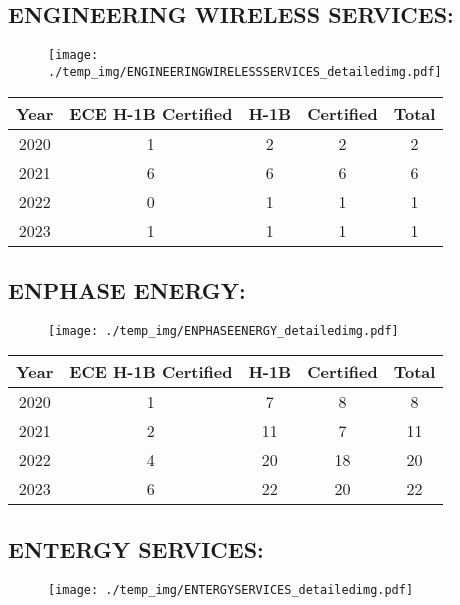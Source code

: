 \documentclass{article}%
\begin{document}
%
\newpage%
\subsection{ENGINEERING WIRELESS SERVICES:}%
\label{subsec:ENGINEERINGWIRELESSSERVICES}%
\label{ENGINEERINGWIRELESSSERVICESdetailed}%


\begin{figure}[htbp]%
\centering%
\texttt{[image: ./temp\_img/ENGINEERINGWIRELESSSERVICES\_detailedimg.pdf]}%
\end{figure}

%
\begin{longtable}{c|c|c|c|c}%
\hline%
Year&ECE H{-}1B Certified&H{-}1B&Certified&Total\\%
\hline%
2020&1&2&2&2\\%
\hline%
2021&6&6&6&6\\%
\hline%
2022&0&1&1&1\\%
\hline%
2023&1&1&1&1\\%
\hline%
\end{longtable}

%
\newpage%
\subsection{ENPHASE ENERGY:}%
\label{subsec:ENPHASEENERGY}%
\label{ENPHASEENERGYdetailed}%


\begin{figure}[htbp]%
\centering%
\texttt{[image: ./temp\_img/ENPHASEENERGY\_detailedimg.pdf]}%
\end{figure}

%
\begin{longtable}{c|c|c|c|c}%
\hline%
Year&ECE H{-}1B Certified&H{-}1B&Certified&Total\\%
\hline%
2020&1&7&8&8\\%
\hline%
2021&2&11&7&11\\%
\hline%
2022&4&20&18&20\\%
\hline%
2023&6&22&20&22\\%
\hline%
\end{longtable}

%
\newpage%
\subsection{ENTERGY SERVICES:}%
\label{subsec:ENTERGYSERVICES}%
\label{ENTERGYSERVICESdetailed}%


\begin{figure}[htbp]%
\centering%
\texttt{[image: ./temp\_img/ENTERGYSERVICES\_detailedimg.pdf]}%
\end{figure}
\end{document}
